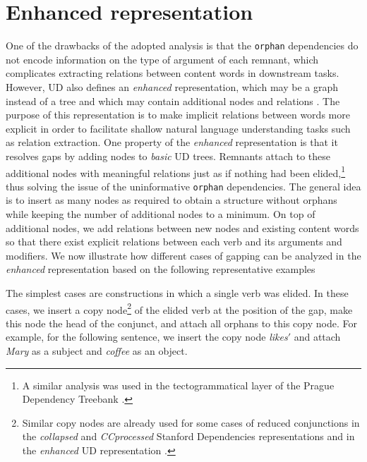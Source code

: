 \documentclass[11pt]{article}
\begin{document}



\section{Enhanced representation}

One of the drawbacks of the adopted analysis is that the \texttt{orphan} dependencies
do not encode information on the type of argument of each remnant, which complicates 
extracting relations between content words in downstream tasks. However, UD also defines an \textit{enhanced} 
representation, which may be a graph instead of a tree and which may contain additional 
nodes and relations \cite{Nivre2016,Schuster2016}. The purpose of this representation is to
 make implicit relations between words more explicit in order to facilitate shallow natural language 
 understanding tasks such as relation extraction. One property of the \textit{enhanced} representation 
 is that it resolves gaps by adding nodes to \textit{basic} UD trees. Remnants attach to these additional
 nodes with meaningful relations just as if nothing had been elided,\footnote{A similar analysis was used in the tectogrammatical layer of the Prague Dependency Treebank \cite{PDT2013}.} thus solving the issue of the uninformative \texttt{orphan} dependencies. The general idea is to insert 
 as many nodes as required to obtain a structure  without orphans while keeping the number 
 of additional nodes to a minimum. On top of additional nodes, we add relations between 
 new nodes and existing content words so that there exist explicit relations between each 
 verb and its arguments and modifiers.  We now illustrate how different cases of gapping 
 can be analyzed in the \textit{enhanced} representation based on the following representative examples

The simplest cases are constructions in which a single verb was elided. In these cases, we insert a copy node\footnote{Similar copy nodes are already used for some cases of reduced conjunctions in the \textit{collapsed} and \textit{CCprocessed} Stanford Dependencies representations \cite{DeMarneffe2008} and in the \textit{enhanced} UD representation \cite{Schuster2016}.} of the elided verb at the position of the gap, make this node the head of the conjunct, and attach all orphans to this copy node. For example, for the following sentence, we insert the copy node \textit{likes$'$} and attach \textit{Mary} as a subject and \textit{coffee} as an object.
\end{document}
